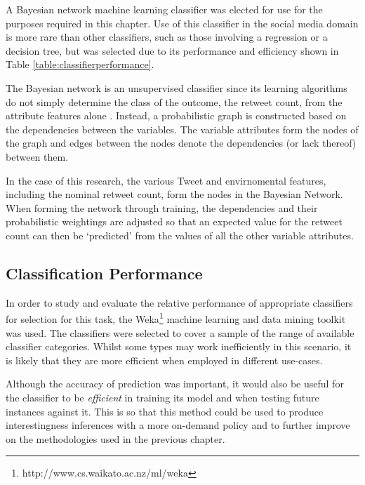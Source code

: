 A Bayesian network machine learning classifier was elected for use for the purposes required in this chapter. Use of this classifier in the social media domain is more rare than other classifiers, such as those involving a regression or a decision tree, but was selected due to its performance and efficiency shown in Table \ref{table:classifierperformance}.  

The Bayesian network is an unsupervised classifier since its learning algorithms do not simply determine the class of the outcome, the retweet count, from the attribute features alone \cite{friedman97}. Instead, a probabilistic graph is constructed based on the dependencies between the variables. The variable attributes form the nodes of the graph and edges between the nodes denote the dependencies (or lack thereof) between them.

In the case of this research, the various Tweet and envirnomental features, including the nominal retweet count, form the nodes in the Bayesian Network. When forming the network through training, the dependencies and their probabilistic weightings are adjusted so that an expected value for the retweet count can then be `predicted' from the values of all the other variable attributes.


\subsection{Classification Performance}
\label{section:classification_performance}
In order to study and evaluate the relative performance of appropriate classifiers for selection for this task, the Weka\footnote{http://www.cs.waikato.ac.nz/ml/weka} machine learning and data mining toolkit was used. The classifiers were selected to cover a sample of the range of available classifier categories. Whilst some types may work inefficiently in this scenario, it is likely that they are more efficient when employed in different use-cases.

Although the accuracy of prediction was important, it would also be useful for the classifier to be \textit{efficient} in training its model and when testing future instances against it. This is so that this method could be used to produce interestingness inferences with a more on-demand policy and to further improve on the methodologies used in the previous chapter.

